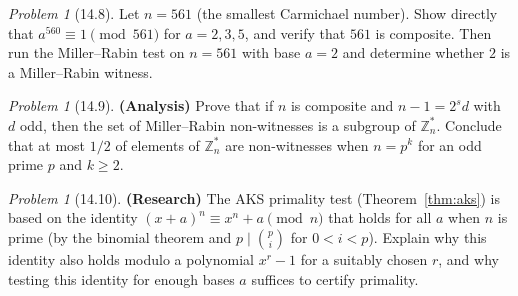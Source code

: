 \documentclass[twoside,12pt]{book}
\theoremstyle{plain}
\theoremstyle{definition}
\theoremstyle{remark}
\newtheorem{problem}[theorem]{Problem}
\begin{document}
\begin{problem}[14.8]
Let $n = 561$ (the smallest Carmichael number). Show directly that $a^{560} \equiv 1 \pmod{561}$ for $a = 2, 3, 5$, and verify that $561$ is composite. Then run the Miller--Rabin test on $n = 561$ with base $a = 2$ and determine whether $2$ is a Miller--Rabin witness.
\end{problem}

\begin{problem}[14.9]
\textbf{(Analysis)} Prove that if $n$ is composite and $n - 1 = 2^s d$ with $d$ odd, then the set of Miller--Rabin non-witnesses is a subgroup of $\mathbb{Z}_n^*$. Conclude that at most $1/2$ of elements of $\mathbb{Z}_n^*$ are non-witnesses when $n = p^k$ for an odd prime $p$ and $k \geq 2$.
\end{problem}

\begin{problem}[14.10]
\textbf{(Research)} The AKS primality test (Theorem~\ref{thm:aks}) is based on the identity $(x + a)^n \equiv x^n + a \pmod{n}$ that holds for all $a$ when $n$ is prime (by the binomial theorem and $p \mid \binom{p}{i}$ for $0 < i < p$). Explain why this identity also holds modulo a polynomial $x^r - 1$ for a suitably chosen $r$, and why testing this identity for enough bases $a$ suffices to certify primality.
\end{problem}
\end{document}
